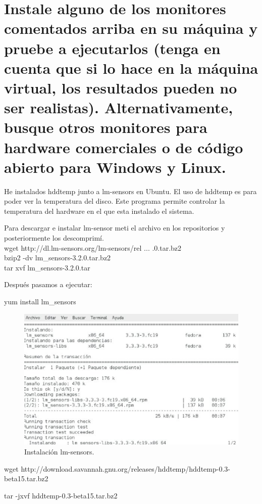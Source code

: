 \section{Instale alguno de los monitores comentados arriba en su máquina y pruebe a ejecutarlos (tenga en cuenta que si lo hace en la máquina virtual, los resultados pueden no ser realistas). Alternativamente, busque otros monitores para hardware comerciales o de código abierto para Windows y Linux. }

He instalados hddtemp junto a lm-sensors en Ubuntu. El uso de hddtemp es para poder ver la temperatura del disco. Este programa permite controlar la temperatura del hardware en el que esta instalado el sistema.



Para descargar e instalar lm-sensor meti el archivo en los repositorios y posteriormente los descomprimí.
\\
wget http://dl.lm-sensors.org/lm-sensors/rel ... .0.tar.bz2
\\
bzip2 -dv lm\_sensors-3.2.0.tar.bz2
\\
tar xvf lm\_sensors-3.2.0.tar

Después pasamos a ejecutar:

yum install lm\_sensors


\begin{figure}[H]
\begin{center}
\includegraphics[scale=0.6]{imagenes/ejercicio6-1.eps}
\caption{Instalación lm-sensors.}
\end{center}
\end{figure}

 wget http://download.savannah.gnu.org/releases/hddtemp/hddtemp-0.3-beta15.tar.bz2

tar -jxvf hddtemp-0.3-beta15.tar.bz2

